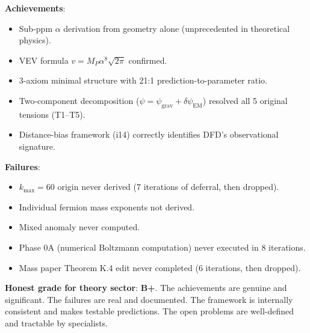 \documentclass[11pt,a4paper]{article}
\begin{document}
\begin{tcolorbox}[colback=blue!5!white, colframe=blue!60!black,
  title={Theory Sector: Honest Final Assessment}]

\textbf{Achievements}:
\begin{itemize}
\item Sub-ppm $\alpha$ derivation from geometry alone (unprecedented in theoretical physics).
\item VEV formula $v = M_P \alpha^8 \sqrt{2\pi}$ confirmed.
\item 3-axiom minimal structure with 21:1 prediction-to-parameter ratio.
\item Two-component decomposition ($\psi = \psi_{\text{grav}} + \delta\psi_{\text{EM}}$) resolved all 5 original tensions (T1--T5).
\item Distance-bias framework (i14) correctly identifies DFD's observational signature.
\end{itemize}

\textbf{Failures}:
\begin{itemize}
\item $k_{\max} = 60$ origin never derived (7 iterations of deferral, then dropped).
\item Individual fermion mass exponents not derived.
\item Mixed anomaly never computed.
\item Phase 0A (numerical Boltzmann computation) never executed in 8 iterations.
\item Mass paper Theorem K.4 edit never completed (6 iterations, then dropped).
\end{itemize}

\textbf{Honest grade for theory sector}: \textbf{B+}. The achievements are genuine and significant. The failures are real and documented. The framework is internally consistent and makes testable predictions. The open problems are well-defined and tractable by specialists.
\end{tcolorbox}
\end{document}
